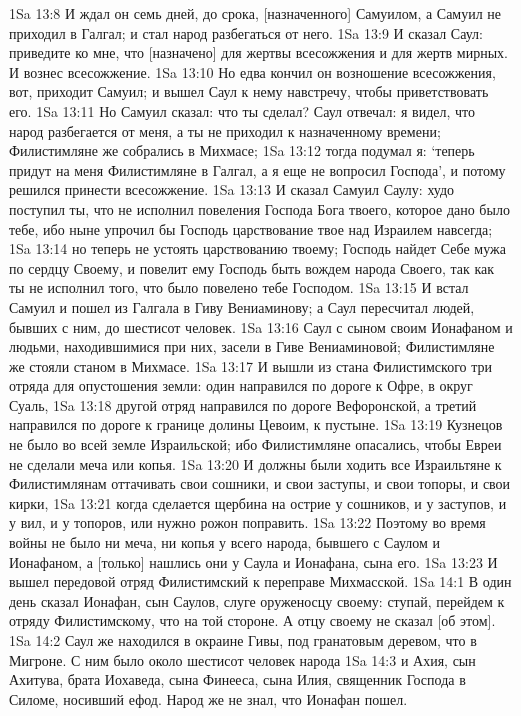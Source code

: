 1Sa 13:8  И ждал он семь дней, до срока, [назначенного] Самуилом, а Самуил не приходил в Галгал; и стал народ разбегаться от него.
1Sa 13:9  И сказал Саул: приведите ко мне, что [назначено] для жертвы всесожжения и для жертв мирных. И вознес всесожжение.
1Sa 13:10  Но едва кончил он возношение всесожжения, вот, приходит Самуил; и вышел Саул к нему навстречу, чтобы приветствовать его.
1Sa 13:11  Но Самуил сказал: что ты сделал? Саул отвечал: я видел, что народ разбегается от меня, а ты не приходил к назначенному времени; Филистимляне же собрались в Михмасе;
1Sa 13:12  тогда подумал я: `теперь придут на меня Филистимляне в Галгал, а я еще не вопросил Господа', и потому решился принести всесожжение.
1Sa 13:13  И сказал Самуил Саулу: худо поступил ты, что не исполнил повеления Господа Бога твоего, которое дано было тебе, ибо ныне упрочил бы Господь царствование твое над Израилем навсегда;
1Sa 13:14  но теперь не устоять царствованию твоему; Господь найдет Себе мужа по сердцу Своему, и повелит ему Господь быть вождем народа Своего, так как ты не исполнил того, что было повелено тебе Господом.
1Sa 13:15  И встал Самуил и пошел из Галгала в Гиву Вениаминову; а Саул пересчитал людей, бывших с ним, до шестисот человек.
1Sa 13:16  Саул с сыном своим Ионафаном и людьми, находившимися при них, засели в Гиве Вениаминовой; Филистимляне же стояли станом в Михмасе.
1Sa 13:17  И вышли из стана Филистимского три отряда для опустошения земли: один направился по дороге к Офре, в округ Суаль,
1Sa 13:18  другой отряд направился по дороге Вефоронской, а третий направился по дороге к границе долины Цевоим, к пустыне.
1Sa 13:19  Кузнецов не было во всей земле Израильской; ибо Филистимляне опасались, чтобы Евреи не сделали меча или копья.
1Sa 13:20  И должны были ходить все Израильтяне к Филистимлянам оттачивать свои сошники, и свои заступы, и свои топоры, и свои кирки,
1Sa 13:21  когда сделается щербина на острие у сошников, и у заступов, и у вил, и у топоров, или нужно рожон поправить.
1Sa 13:22  Поэтому во время войны не было ни меча, ни копья у всего народа, бывшего с Саулом и Ионафаном, а [только] нашлись они у Саула и Ионафана, сына его.
1Sa 13:23  И вышел передовой отряд Филистимский к переправе Михмасской.
1Sa 14:1  В один день сказал Ионафан, сын Саулов, слуге оруженосцу своему: ступай, перейдем к отряду Филистимскому, что на той стороне. А отцу своему не сказал [об этом].
1Sa 14:2  Саул же находился в окраине Гивы, под гранатовым деревом, что в Мигроне. С ним было около шестисот человек народа
1Sa 14:3  и Ахия, сын Ахитува, брата Иохаведа, сына Финееса, сына Илия, священник Господа в Силоме, носивший ефод. Народ же не знал, что Ионафан пошел.
